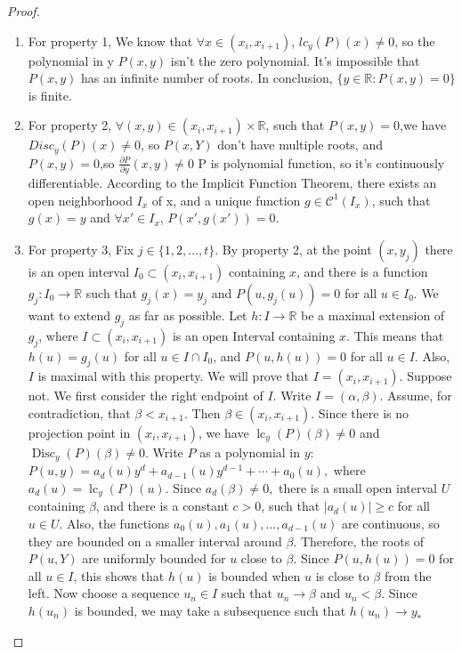 \documentclass{article}
\begin{document}
\begin{proof}
    \begin{enumerate}
        \item  For property 1, We know that \(\forall x \in (x_{i},x_{i+1})\), \(lc_{y}(P)(x) \neq 0\), so the polynomial in y \(P(x,y)\) isn't the zero polynomial. It's impossible that \(P(x,y)\) has an infinite number of roots. In conclusion, $\lbrace y \in \mathbb{R} : P(x,y) = 0 \rbrace$ is finite.
        \item  For property 2, \(\forall (x, y) \in (x_{i},x_{i+1}) \times \mathbb{R}\), such that \(P(x,y)=0\),we have \\\(Disc_{y}(P)(x) \neq 0\), so \(P(x,Y)\) don't have multiple roots, and \(P(x,y)=0\),so \(\frac{\partial P}{\partial y}(x,y) \neq 0\) P is polynomial function, so it's continuously differentiable. According to the Implicit Function Theorem, there exists an open neighborhood \(I_{x}\) of x, and a unique function \(g \in \mathcal{C}^{1}(I_{x})\), such that \(g(x) = y\) and \(\forall x' \in I_{x}\), \(P(x', g(x')) =0\).
        \item  For property 3, Fix \(j \in \{1,2,\dots,t\}.\) By property 2, at the point \((x,y_j)\) there is an open interval \(I_0\subset (x_i,x_{i+1})\) containing \(x\), and there is a function \(g_j:I_0 \to \mathbb{R}\) such that \(g_j(x)=y_j\) and \(P(u,g_j(u))=0\) for all \(u\in I_0\).
               We want to extend \(g_j\) as far as possible. Let \(h:I\to \mathbb{R}\) be a maximal extension of \(g_j\), where \(I\subset (x_i,x_{i+1})\) is an open Interval containing \(x\). This means that \(h(u)=g_j(u)\) for all \(u\in I\cap I_0\), and \(P(u,h(u))=0\) for all \(u\in I\). Also, \(I\) is maximal with this property. We will prove that \(I=(x_i,x_{i+1}).\) Suppose not. We first consider the right endpoint of \(I\). Write \(I=(\alpha,\beta).\) Assume, for contradiction, that \(\beta<x_{i+1}.\) Then \(\beta\in (x_i,x_{i+1}).\) Since there is no projection point in \((x_i,x_{i+1})\), we have \(\operatorname{lc}_y(P)(\beta)\neq 0\) and \(\operatorname{Disc}_y(P)(\beta)\neq 0.\) Write \(P\) as a polynomial in \(y\): \(P(u,y)=a_d(u)y^d+a_{d-1}(u)y^{d-1}+\cdots+a_0(u),\) where \(a_d(u)=\operatorname{lc}_y(P)(u).\) Since \(a_d(\beta)\neq 0,\)
               there is a small open interval \(U\) containing \(\beta\), and there is a
               constant \(c>0\), such that \(|a_d(u)|\geq c\) for all \(u\in U\). Also, the functions \(a_0(u),a_1(u),\dots,a_{d-1}(u)\) are continuous, so they are bounded on a smaller interval around \(\beta\). Therefore, the roots of \(P(u,Y)\) are uniformly bounded for \(u\) close to \(\beta\). Since \(P(u,h(u))=0\) for all \(u\in I\), this shows that \(h(u)\) is bounded when \(u\) is close to \(\beta\) from the left. Now choose a sequence \(u_n\in I\) such that \(u_n\to \beta\) and \(u_n<\beta.\) Since \(h(u_n)\) is bounded, we may take a subsequence such that \(h(u_n)\to y_\ast\)

\end{enumerate}
\end{proof}
\end{document}
